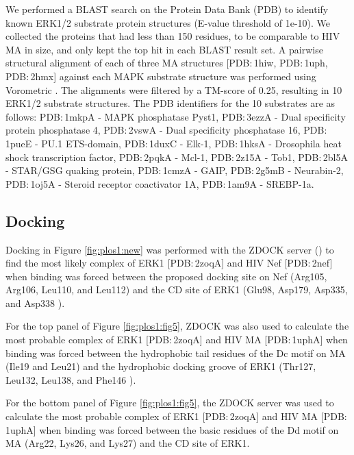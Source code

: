 We performed a BLAST \cite{altschul90} search on the Protein Data Bank
(PDB) \cite{berman02} to identify known ERK1/2 substrate protein
structures (E-value threshold of 1e-10). We collected the proteins that
had less than 150 residues, to be comparable to HIV MA in size, and
only kept the top hit in each BLAST result set. A pairwise structural
alignment of each of three MA structures [PDB$\colon$1hiw,
  PDB$\colon$1uph, PDB$\colon$2hmx] against each MAPK substrate
structure was performed using Vorometric \cite{sacan08}. The
alignments were filtered by a TM-score \cite{zhang04} of 0.25,
resulting in 10 ERK1/2 substrate structures. The PDB identifiers for
the 10 substrates are as follows: PDB$\colon$1mkpA - MAPK phosphatase
Pyst1, PDB$\colon$3ezzA - Dual specificity protein phosphatase 4,
PDB$\colon$2vswA - Dual specificity phosphatase 16, PDB$\colon$1pueE -
PU.1 ETS-domain, PDB$\colon$1duxC - Elk-1, PDB$\colon$1hksA -
Drosophila heat shock transcription factor, PDB$\colon$2pqkA - Mcl-1,
PDB$\colon$2z15A - Tob1, PDB$\colon$2bl5A - STAR/GSG quaking protein,
PDB$\colon$1cmzA - GAIP, PDB$\colon$2g5mB - Neurabin-2,
PDB$\colon$1oj5A - Steroid receptor coactivator 1A, PDB$\colon$1am9A -
SREBP-1a.

\subsection{Docking}

Docking in Figure \ref{fig:plos1:new} was performed with the ZDOCK
server ()
to find the most likely complex of ERK1 [PDB$\colon$2zoqA] and HIV Nef
[PDB$\colon$2nef] when binding was forced between the proposed docking
site on Nef (Arg105, Arg106, Leu110, and Leu112) and the CD site of
ERK1 (Glu98, Asp179, Asp335, and Asp338 \cite{kinoshita08}).

For the top panel of Figure \ref{fig:plos1:fig5}, ZDOCK was also used
to calculate the most probable complex of ERK1 [PDB$\colon$2zoqA] and
HIV MA [PDB$\colon$1uphA] when binding was forced between the
hydrophobic tail residues of the Dc motif on MA (Ile19 and Leu21) and
the hydrophobic docking groove of ERK1 (Thr127, Leu132, Leu138, and
Phe146 \cite{kinoshita08}).

For the bottom panel of Figure \ref{fig:plos1:fig5}, the ZDOCK
server was used to calculate the most probable complex of ERK1
[PDB$\colon$2zoqA] and HIV MA [PDB$\colon$1uphA] when binding was
forced between the basic residues of the Dd motif on MA (Arg22, Lys26,
and Lys27) and the CD site of ERK1.

